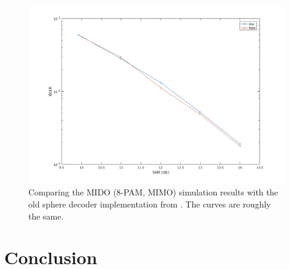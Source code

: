 \documentclass[english,12pt,a4paper,pdftex,sci,utf8]{aaltothesis}
\begin{document}
\begin{figure}[ht]
  \centering
\includegraphics[width=\linewidth]{mido_sample_all_65k_unbiased}
  \caption{Comparing the MIDO (8-PAM, MIMO) simulation results with the old sphere decoder implementation from \cite{ranto}. The curves are roughly the same.}
  \label{fig:mido}
\end{figure}
\clearpage

\section{Conclusion}
\label{sec:conc}

\clearpage
\end{document}
